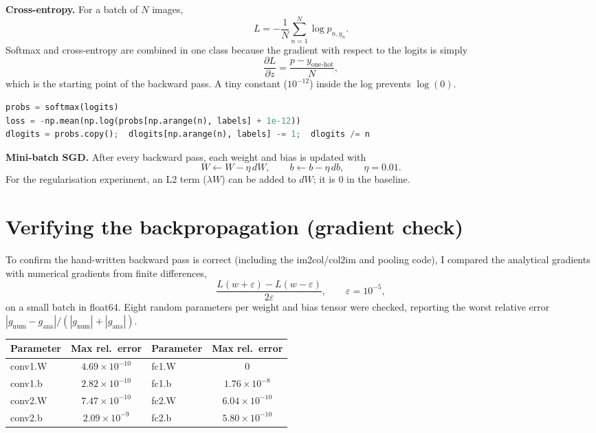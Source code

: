 \documentclass[11pt,a4paper]{article}
\begin{document}
\textbf{Cross-entropy.} For a batch of $N$ images,
\[
L=-\frac{1}{N}\sum_{n=1}^{N}\log p_{n,y_n}.
\]
Softmax and cross-entropy are combined in one class because the gradient with respect to the logits is simply
\[
\frac{\partial L}{\partial z}=\frac{p-y_{\text{one-hot}}}{N},
\]
which is the starting point of the backward pass. A tiny constant ($10^{-12}$) inside the log prevents $\log(0)$.
\begin{lstlisting}[language=Python]
probs = softmax(logits)
loss = -np.mean(np.log(probs[np.arange(n), labels] + 1e-12))
dlogits = probs.copy();  dlogits[np.arange(n), labels] -= 1;  dlogits /= n
\end{lstlisting}

\textbf{Mini-batch SGD.} After every backward pass, each weight and bias is updated with
\[
W \leftarrow W-\eta\,dW,\qquad b\leftarrow b-\eta\,db,\qquad \eta=0.01 .
\]
For the regularisation experiment, an L2 term ($\lambda W$) can be added to $dW$; it is 0 in the baseline.

\section{Verifying the backpropagation (gradient check)}
To confirm the hand-written backward pass is correct (including the im2col/col2im and pooling code), I compared the analytical gradients with numerical gradients from finite differences,
\[
\frac{L(w+\varepsilon)-L(w-\varepsilon)}{2\varepsilon},\qquad \varepsilon=10^{-5},
\]
on a small batch in float64. Eight random parameters per weight and bias tensor were checked, reporting the worst relative error $|g_{\text{num}}-g_{\text{ana}}|/(|g_{\text{num}}|+|g_{\text{ana}}|)$.

\begin{table}[H]
\centering
\begin{tabular}{@{}lclc@{}}
\toprule
\textbf{Parameter} & \textbf{Max rel.\ error} & \textbf{Parameter} & \textbf{Max rel.\ error} \\
\midrule
conv1.W & $4.69\times10^{-10}$ & fc1.W & $0$ \\
conv1.b & $2.82\times10^{-10}$ & fc1.b & $1.76\times10^{-8}$ \\
conv2.W & $7.47\times10^{-10}$ & fc2.W & $6.04\times10^{-10}$ \\
conv2.b & $2.09\times10^{-9}$  & fc2.b & $5.80\times10^{-10}$ \\
\bottomrule
\end{tabular}
\end{table}
\end{document}
